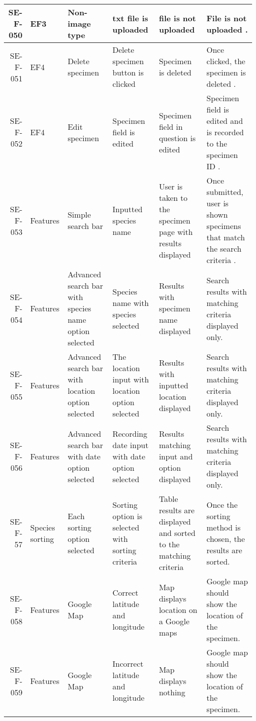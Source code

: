 \begin{landscape}
\begin{longtable}{|r|l|p{4cm}|p{4cm}|p{4cm}|p{4cm}|}
SE-F-050 & EF3 & Non-image type & txt file is uploaded & file is not uploaded & File is not uploaded .& \\ \hline
				
SE-F-051 & EF4 & Delete specimen & Delete specimen button is clicked & Specimen is deleted & Once clicked, the specimen is deleted .& \\ \hline
			
SE-F-052 & EF4 & Edit specimen & Specimen field is edited & Specimen field in question is edited & Specimen field is edited and is recorded to the specimen ID  .& \\ \hline
			
SE-F-053 & Features & Simple search bar & Inputted species name & User is taken to the specimen page with results displayed & Once submitted, user is shown specimens that match the search criteria  .& \\ \hline
		
SE-F-054 & Features & Advanced search bar with species name option selected& Species name with species selected & Results with specimen name displayed & Search results with matching criteria displayed only.& \\ \hline

SE-F-055 & Features & Advanced search bar with location option selected & The location input with location option selected & Results with inputted location displayed & Search results with matching criteria displayed only.& \\ \hline

SE-F-056 & Features & Advanced search bar with date option selected & Recording date input with date option selected & Results matching input and option displayed & Search results with matching criteria displayed only.& \\ \hline
		
SE-F-57 & Species sorting & Each sorting option selected & Sorting option is selected with sorting criteria & Table results are displayed and sorted to the matching criteria & Once the sorting method is chosen, the results are sorted.& \\ \hline
			
SE-F-058 & Features & Google Map & Correct latitude and  longitude & Map displays location on a Google maps & Google map should show the location of the specimen.& \\ \hline

SE-F-059 & Features & Google Map & Incorrect latitude and  longitude & Map displays nothing & Google map should show the location of the specimen.& \\ \hline
		

\end{longtable}
\end{landscape}
